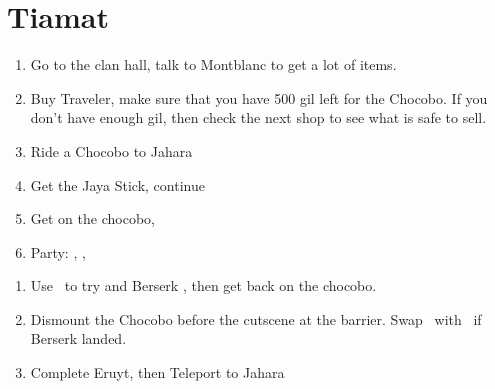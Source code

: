 \chapter{Tiamat}

\begin{enumerate}
	\item Go to the clan hall, talk to Montblanc to get a lot of items.
	\item Buy Traveler, make sure that you have 500 gil left for the Chocobo. If you don't have enough gil, then check the next shop to see what is safe to sell.
	\item Ride a Chocobo to Jahara
	\item Get the Jaya Stick, continue
	\item Get on the chocobo, 
	\item Party: \vaan, \basch, \penelo
\end{enumerate}
\begin{liscense}
\begin{itemize}
\end{itemize}
\end{liscense}
\begin{enumerate}
	\item Use \penelo\ to try and Berserk \basch, then get back on the chocobo.
	\item Dismount the Chocobo before the cutscene at the barrier. Swap \basch\ with \balthier\ if Berserk landed.
	\item Complete Eruyt, then Teleport to Jahara
\end{enumerate}

